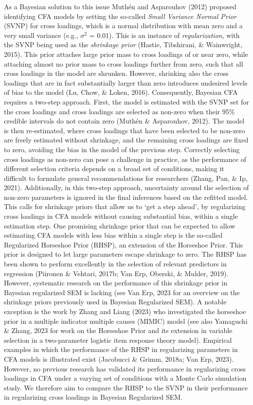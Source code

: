 \documentclass[
  man, donotrepeattitle,floatsintext]{apa6}
\begin{document}
As a Bayesian solution to this issue Muthén and Asparouhov (2012) proposed
identifying CFA models by setting the so-called \emph{Small Variance Normal
Prior} (SVNP) for cross loadings, which is a normal distribution with
mean zero and a very small variance (e.g., \(\sigma^2\) = 0.01). This is
an instance of \emph{regularization}, with the SVNP being used as the
\emph{shrinkage prior} (Hastie, Tibshirani, \& Wainwright, 2015). This prior attaches large
prior mass to cross loadings of or near zero, while attaching almost no
prior mass to cross loadings further from zero, such that all cross
loadings in the model are shrunken. However, shrinking also the cross
loadings that are in fact substantially larger than zero introduces
undesired levels of bias to the model (Lu, Chow, \& Loken, 2016). Consequently,
Bayesian CFA requires a two-step approach. First, the model is estimated
with the SVNP set for the cross loadings and cross loadings are selected
as non-zero when their 95\% credible intervals do not contain zero
(Muthén \& Asparouhov, 2012). The model is then re-estimated, where cross
loadings that have been selected to be non-zero are freely estimated
without shrinkage, and the remaining cross loadings are fixed to zero,
avoiding the bias in the model of the previous step. Correctly selecting
cross loadings as non-zero can pose a challenge in practice, as the
performance of different selection criteria depends on a broad set of
conditions, making it difficult to formulate general recommendations for
researchers (Zhang, Pan, \& Ip, 2021). Additionally, in this two-step
approach, uncertainty around the selection of non-zero parameters is
ignored in the final inferences based on the refitted model. This calls
for shrinkage priors that allow us to `get a step ahead', by
regularizing cross loadings in CFA models without causing substantial
bias, within a single estimation step. One promising shrinkage prior
that can be expected to allow estimating CFA models with less bias
within a single step is the so-called Regularized Horseshoe Prior
(RHSP), an extension of the Horseshoe Prior. This prior is designed to
let large parameters escape shrinkage to zero. The RHSP has been shown
to perform excellently in the selection of relevant predictors in
regression (Piironen \& Vehtari, 2017b; Van Erp, Oberski, \& Mulder, 2019). However,
systematic research on the performance of this shrinkage prior in
Bayesian regularized SEM is lacking (see Van Erp, 2023 for an
overview on the shrinkage priors previously used in Bayesian Regularized
SEM). A notable exception is the work by Zhang and Liang (2023) who
investigated the horseshoe prior in a multiple indicator multiple causes
(MIMIC) model (see also Yamaguchi \& Zhang, 2023 for work on the Horseshoe
Prior and its extension in variable selection in a two-parameter
logistic item response theory model). Empirical examples in which the
performance of the RHSP in regularizing parameters in CFA models is
illustrated exist (Jacobucci \& Grimm, 2018a; Van Erp, 2023). However,
no previous research has validated its performance in regularizing cross
loadings in CFA under a varying set of conditions with a Monte Carlo
simulation study. We therefore aim to compare the RHSP to the SVNP in
their performance in regularizing cross loadings in Bayesian Regularized
SEM.
\end{document}
